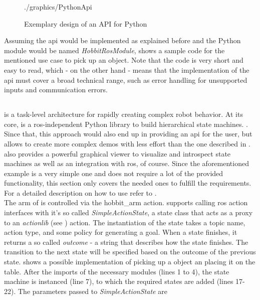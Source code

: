\begin{figure}[htbp]
	\centering
	\begin{overpic}[width=0.8\linewidth]{./graphics/PythonApi}
	\end{overpic}
	\caption{Exemplary design of an API for Python}%
	\label{fig:PythonApi}%
\end{figure}

Assuming the \gls{api} would be implemented as explained before and the Python module would be named \textit{HobbitRosModule},  shows a sample code for the mentioned use case to pick up an object. Note that the code is very short and easy to read, which - on the other hand - means that the implementation of the \gls{api} must cover a broad technical range, such as error handling for unsupported inputs and communication errors.

\begin{figure}[htbp]
	
\end{figure}

\subsection{\smach{}}
\smach{} is a task-level architecture for rapidly creating complex robot behavior. At its core, \smach{} is a \gls{ros}-independent Python library to build hierarchical state machines. \cite{SmachROS}. Since that, this approach would also end up in providing an \gls{api} for the user, but allows to create more complex demos with less effort than the one described in . \smach{} also provides a powerful graphical viewer to visualize and introspect state machines as well as an integration with \gls{ros}, of course. Since the aforementioned example is a very simple one and does not require a lot of the provided \smach{} functionality, this section only covers the needed ones to fulfill the requirements. For a detailed description on how to use \smach{} refer to \cite{SmachROS}. \\

The arm of \hobbit{} is controlled via the hobbit\_arm action. \smach{} supports calling \gls{ros} action interfaces with it's so called \textit{SimpleActionState}, a state class that acts as a proxy to an \textit{actionlib} (see ) action. The instantiation of the state takes a topic name, action type, and some policy for generating a goal. When a state finishes, it returns a so called \textit{outcome} - a string that describes how the state finishes. The transition to the next state will be specified based on the outcome of the previous state.  shows a possible implementation of picking up a object an placing it on the table. After the imports of the necessary modules (lines 1 to 4), the state machine is instanced (line 7), to which the required states are added (lines 17-22). The parameters passed to \textit{SimpleActionState} are

